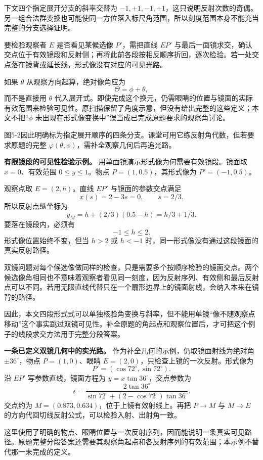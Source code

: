 \documentclass[12pt,a4paper,UTF8]{ctexart}
\begin{document}
下文四个指定展开分支的斜率交替为
\(-1,+1,-1,+1\)，这只说明反射次数的奇偶。另一组合法群变换也可能使同一方位落入标尺角范围，所以刻度范围本身不能充当完整的分支选择证明。

要检验观察者 \(E\) 是否看见某候选像 \(P'\)，需把直线 \(EP'\)
与最后一面镜求交，确认交点位于有效镜段和反射侧；再将此前各段按相反顺序折回，逐次检验。若一处交点落在镜背或延长线，形式像没有对应的可见光路。

如果 \(\theta\) 从观察方向起算，绝对像角应为 \[
\Theta=\phi+\theta,
\] 而不是直接用 \(\theta\)
代入展开式。即使完成这个换元，仍需眼睛的位置与镜面的实际有效范围来检验可见性。原扫描保留了角度示意，但没有给出完整的这些定义；本文不把``\(\phi\)
未出现在形式像变换中''误当成已完成原题要求的观察角讨论。

图5-2因此明确标为指定展开顺序的四条分支。课堂可用它练反射角代数，但若要求原题的完整
\(\varphi(\theta,\phi)\)，需补全观察几何后再追光路。

\textbf{有限镜段的可见性检验示例。}
用单面镜演示形式像为何需要有效镜段。镜面取 \(x=0\)、有效范围
\(0\le y\le1\)。物点 \(P=(1,0.5)\)，其形式像为 \(P'=(-1,0.5)\)。

观察点取 \(E=(2,h)\)。直线 \(EP'\) 与镜面的参数交点满足 \[
x(s)=2-3s=0,\qquad s=2/3.
\] 所以反射点纵坐标为 \[
y_M=h+(2/3)(0.5-h)=h/3+1/3.
\] 要落在镜段内，必须有 \[
-1\le h\le2.
\] 形式像位置始终不变，但当 \(h>2\) 或 \(h<-1\)
时，同一形式像没有通过这段镜面的真实反射路径。

双镜问题对每个候选像做同样的检查，只是需要多个按顺序检验的镜面交点。两个候选像角相同也不意味着观察者看见同一刻度，因为反射序列、有效侧和最后反射点可以不同。若用无限直线代替只在一个扇形边界上的镜面射线，会纳入本来在镜背的路径。

因此，本文四段形式式可以单独核验角变换与斜率，但不能用单镜``像不随观察点移动''这个事实跳过双镜可见性。补全原题的角起点和观察位置后，才可把这个例子的线段求交方法用于完整分段答案。

\textbf{一条已定义双镜几何中的实光路。}
作为补全几何的示例，仍取镜面射线为绝对角 \(\pm36^\circ\)，物点
\(P=(1,0)\)、眼睛 \(E=(2,0)\)，只检查上镜的一次反射。形式像为 \[
P'=(\cos72^\circ,\sin72^\circ).
\] 沿 \(EP'\) 写参数直线，镜面方程为 \(y=x\tan36^\circ\)，交点参数为 \[
s=\frac{2\tan36^\circ}{\sin72^\circ+(2-\cos72^\circ)\tan36^\circ}.
\] 交点约为 \(M=(0.873,0.634)\)，位于上镜有效射线上。再把 \(P\to M\) 与
\(M\to E\) 的方向代回切线反射公式，可以检验入射、出射角一致。

这里使用了明确的物点、眼睛位置与一次反射序列，因而能说明一条真实可见路径。原题完整分段答案还需要其观察角起点和各反射序列的有效范围；本示例不替代那一未完成的定义。
\end{document}
